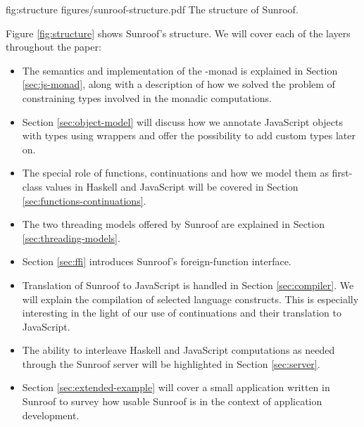 \Figure%
{fig:structure}%
{figures/sunroof-structure.pdf}%
{The structure of Sunroof.}

Figure \ref{fig:structure} shows Sunroof's structure.
We will cover each of the layers throughout the paper:
\begin{itemize}
\item
The semantics and implementation of the \JS-monad is explained 
in Section \ref{sec:js-monad}, along with a description of how
we solved
the problem of constraining types involved in the monadic 
computations.
\item
Section \ref{sec:object-model} will discuss how we annotate 
JavaScript objects with types using wrappers 
and offer the possibility to add custom types later on.
\item
The special role of functions, continuations and
how we model them as first-class values in Haskell and JavaScript
will be covered in Section \ref{sec:functions-continuations}.
\item
The two threading models offered by Sunroof are explained 
in Section \ref{sec:threading-models}.
\item
Section \ref{sec:ffi} introduces Sunroof's foreign-function interface.
\item
Translation of Sunroof to JavaScript is handled in 
Section \ref{sec:compiler}. We will explain the 
compilation of selected language constructs. This is 
especially interesting in the light of our use of continuations
and their translation to JavaScript.
\item
The ability to interleave Haskell and JavaScript computations as needed
through the Sunroof server will be highlighted in Section \ref{sec:server}.
\item
Section \ref{sec:extended-example} will cover a small application 
written in Sunroof to survey how usable Sunroof is in the 
context of application development. 
\end{itemize}


